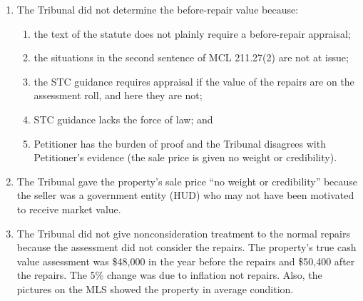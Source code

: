 \documentclass[12pt,\documentclassflag]{michiganCourtOfAppealsBrief}
\begin{document}
\begin{enumerate}
  
\item The Tribunal did not determine the before-repair value because:
  \begin{enumerate}
  \item the text of the statute does not plainly require a before-repair appraisal;
  \item the situations in the second sentence of MCL 211.27(2) are not at issue;
  \item the STC guidance requires appraisal if the value of the repairs are on the assessment roll, and here they are not;
  \item STC guidance lacks the force of law; and
  \item Petitioner has the burden of proof and the Tribunal disagrees with Petitioner's evidence (the sale price is given no weight or credibility).
  \end{enumerate}
  
\item The Tribunal gave the property's sale price ``no weight or credibility'' because the seller was a government entity (HUD) who may not have been motivated to receive market value.
  
\item The Tribunal did not give nonconsideration treatment to the normal repairs because the assessment did not consider the repairs. The property's true cash value assessment was \$48,000 in the year before the repairs and \$50,400 after the repairs. The 5\% change was due to inflation not repairs. Also, the pictures on the MLS showed the property in average condition.

\end{enumerate}

\end{document}

